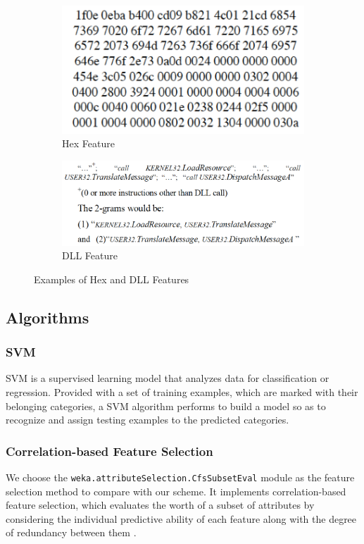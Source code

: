 \documentclass[11pt]{article}
\begin{document}
\begin{figure}[htbp]
\centering
\begin{subfigure}[htbp]{0.4\columnwidth}
\includegraphics*[width=\textwidth]{fig/hex}
\caption{Hex Feature}
\label{fig:hex}
\end{subfigure}
\hfill
\begin{subfigure}[htbp]{0.57\columnwidth}
\includegraphics*[width=\textwidth]{fig/DLL}
\caption{DLL Feature}
\label{fig:DLL}
\end{subfigure}
\caption{Examples of Hex and DLL Features}
\label{fig:hexDLL}
\end{figure}

\subsection{Algorithms}
\subsubsection{SVM}
SVM \cite{cortes1995support} is a supervised learning model that analyzes data for classification or regression. Provided with a set of training examples, which are marked with their belonging categories, a SVM algorithm performs to build a model so as to recognize and assign testing examples to the predicted categories. 

\subsubsection{Correlation-based Feature Selection}
We choose the \texttt{weka.attributeSelection.CfsSubsetEval} module as the feature selection method to compare with our scheme. It implements correlation-based feature selection, which evaluates the worth of a subset of attributes by considering the individual predictive ability of each feature along with the degree of redundancy between them \cite{hall1999correlation}.
\end{document}
